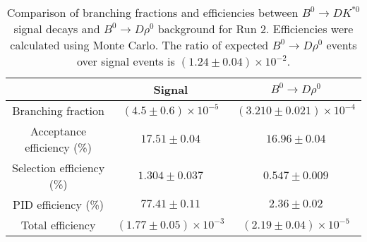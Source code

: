 \begin{table}
    \centering
    \begin{tabular}{ccc}
        \toprule
        & Signal & $B^0 \to D\rho^0$ \\
        \midrule
        Branching fraction & $(4.5 \pm 0.6) \times 10^{-5}$ & $(3.210 \pm 0.021) \times 10^{-4}$ \\
        Acceptance efficiency (\%) & $17.51 \pm 0.04$ & $16.96 \pm 0.04$ \\
        Selection efficiency (\%) & $1.304 \pm 0.037$ & $0.547 \pm 0.009$ \\
        PID efficiency (\%) & $77.41 \pm 0.11$ & $2.36 \pm 0.02$ \\
        \midrule
        Total efficiency & $(1.77 \pm 0.05) \times 10^{-3}$ & $(2.19 \pm 0.04) \times 10^{-5}$ \\
        \bottomrule
        \end{tabular}
        \caption{Comparison of branching fractions and efficiencies between $B^0 \to DK^{*0}$ signal decays and $B^0 \to D\rho^0$ background for Run 2. Efficiencies were calculated using Monte Carlo. The ratio of expected $B^0 \to D\rho^0$ events over signal events is $(1.24 \pm 0.04) \times 10^{-2}$.}
\label{tab:rho_efficiency_run2}
\end{table}
